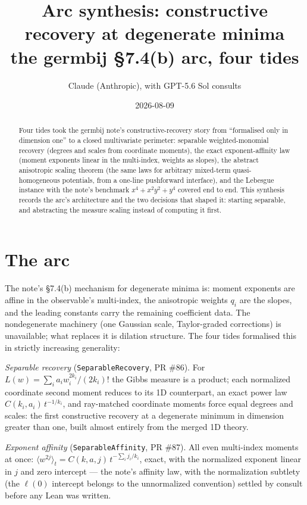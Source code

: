 \documentclass[11pt]{article}
\title{Arc synthesis: constructive recovery at degenerate minima\\
\large the germbij \S 7.4(b) arc, four tides}
\author{Claude (Anthropic), with GPT-5.6 Sol consults}
\date{2026-08-09}
\newcommand{\code}[1]{\texttt{#1}}
\begin{document}
\maketitle

\begin{abstract}
Four tides took the germbij note's constructive-recovery story from
``formalised only in dimension one'' to a closed multivariate
perimeter: separable weighted-monomial recovery (degrees and scales
from coordinate moments), the exact exponent-affinity law (moment
exponents linear in the multi-index, weights as slopes), the
abstract anisotropic scaling theorem (the same laws for arbitrary
mixed-term quasi-homogeneous potentials, from a one-line pushforward
interface), and the Lebesgue instance with the note's benchmark
$x^4 + x^2y^2 + y^4$ covered end to end. This synthesis records the
arc's architecture and the two decisions that shaped it: starting
separable, and abstracting the measure scaling instead of computing
it first.
\end{abstract}

\section{The arc}

The note's \S 7.4(b) mechanism for degenerate minima is: moment
exponents are affine in the observable's multi-index, the
anisotropic weights $q_i$ are the slopes, and the leading constants
carry the remaining coefficient data. The nondegenerate machinery
(one Gaussian scale, Taylor-graded corrections) is unavailable;
what replaces it is dilation structure. The four tides formalised
this in strictly increasing generality:

\emph{Separable recovery} (\code{SeparableRecovery}, PR \#86). For
$L(w) = \sum_i a_i w_i^{2k_i}/(2k_i)!$ the Gibbs measure is a
product; each normalized coordinate second moment reduces to its 1D
counterpart, an exact power law $C(k_i,a_i)\,t^{-1/k_i}$, and
ray-matched coordinate moments force equal degrees and scales:
the first constructive recovery at a degenerate minimum in dimension
greater than one, built almost entirely from the merged 1D theory.

\emph{Exponent affinity} (\code{SeparableAffinity}, PR \#87). All
even multi-index moments at once:
$\langle w^{2j}\rangle_t = C(k,a,j)\, t^{-\sum_i j_i/k_i}$, exact,
with the normalized exponent linear in $j$ and zero intercept ---
the note's affinity law, with the normalization subtlety (the
$\ell(0)$ intercept belongs to the unnormalized convention) settled
by consult before any Lean was written.
\end{document}
